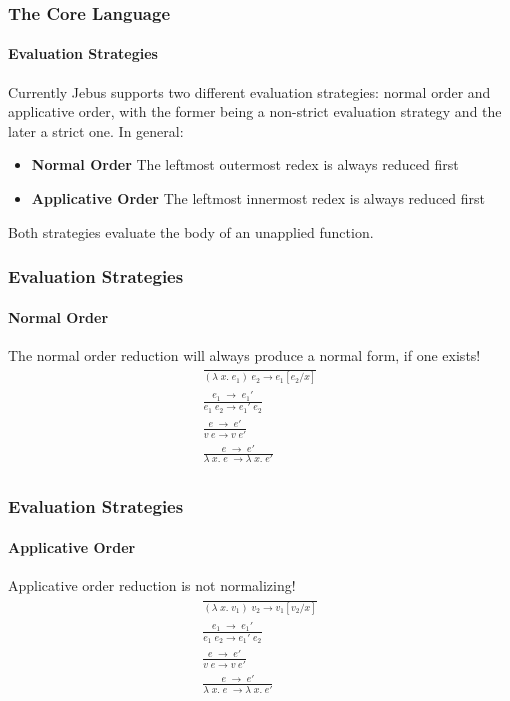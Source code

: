 \documentclass[xcolor=table]{beamer}
\begin{document}
\begin{frame}
\frametitle{The Core Language}
\framesubtitle{Evaluation Strategies}
\begin{block}{
Currently Jebus supports two different evaluation strategies: normal order and applicative order, with the former being a 
non-strict evaluation strategy and the later a strict one.
}
In general:
\begin{itemize}
\item \textbf{Normal Order} The leftmost outermost redex is always reduced first
\\
\item \textbf{Applicative Order} The leftmost innermost redex is always reduced first
\end{itemize}

Both strategies evaluate the body of an unapplied  function.

\end{block}
\end{frame}

\begin{frame}
\frametitle{Evaluation Strategies}
\framesubtitle{Normal Order}
\begin{block}{The normal order reduction will always produce a normal form, if one exists!}
\begin{gather*}
\frac{}{ (\lambda \;x.\;e_1)\;e_2\rightarrow e_1 [e_2/x]} \\[0.25cm]
\frac{e_1\;\rightarrow \;e_1'}{e_1 \; e_2 \rightarrow e_1' \; e_2} \\[0.25cm]
\frac{e\;\rightarrow\;e'}{v \; e \rightarrow v \; e'} \\[0.25cm]
\frac{e\;\rightarrow\;e'}{\lambda\;x.\;e\; \rightarrow \lambda \;x. \;e'} \\[0.25cm]
\end{gather*}

\end{block}
\end{frame}


\begin{frame}
\frametitle{Evaluation Strategies}
\framesubtitle{Applicative Order}
\begin{block}{Applicative order reduction is not normalizing!}
\begin{gather*}
\frac{}{ (\lambda \;x.\;v_1)\;v_2\rightarrow v_1 [v_2/x]} \\[0.3cm]
\frac{e_1\;\rightarrow \;e_1'}{e_1 \; e_2 \rightarrow e_1' \; e_2} \\[0.3cm]
\frac{e\;\rightarrow\;e'}{v \; e \rightarrow v \; e'} \\[0.3cm]
\frac{e\;\rightarrow\;e'}{\lambda\;x.\;e\; \rightarrow \lambda \;x. \;e'} \\[0.3cm]
\end{gather*}
\end{block}
\end{frame}
\end{document}
